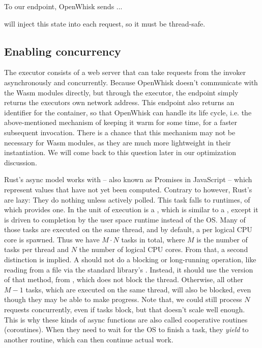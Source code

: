 
To our  endpoint, OpenWhisk sends ...



 will inject this state into each request, so it must be thread-safe.


\subsection{Enabling concurrency}

The executor consists of a web server that can take requests from the invoker asynchronously and concurrently. Because OpenWhisk doesn't communicate with the Wasm modules directly, but through the executor, the  endpoint simply returns the executors own network address. This endpoint also returns an identifier for the container, so that OpenWhisk can handle its life cycle, i.e. the above-mentioned mechanism of keeping it warm for some time, for a faster subsequent invocation. There is a chance that this mechanism may not be necessary for Wasm modules, as they are much more lightweight in their instantiation. We will come back to this question later in our optimization discussion.


Rust's async model works with  -- also known as Promises in JavaScript -- which represent values that have not yet been computed. Contrary to  however, Rust's  are lazy: They do nothing unless actively polled. This task falls to  runtimes, of which  provides one. In  the unit of execution is a , which is similar to a , except it is driven to completion by the user space runtime instead of the OS. Many of those tasks are executed on the same thread, and by default, a  per logical CPU core is spawned. Thus we have $M \cdot N$ tasks in total, where $M$ is the number of tasks per thread and $N$ the number of logical CPU cores.
From that, a second distinction is implied. A  should not do a blocking or long-running operation, like reading from a file via the standard library's . Instead, it should use the  version of that method, from , which does not block the thread. Otherwise, all other $M - 1$ tasks, which are executed on the same thread, will also be blocked, even though they may be able to make progress. Note that, we could still process $N$ requests concurrently, even if tasks block, but that doesn't scale well enough. This is why these kinds of async functions are also called cooperative routines (coroutines). When they need to wait for the OS to finish a task, they \emph{yield} to another routine, which can then continue actual work.


